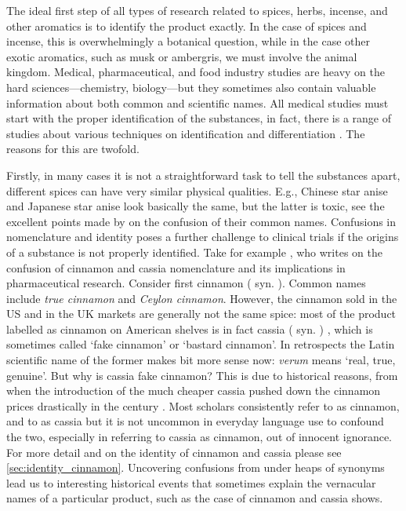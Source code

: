 The ideal first step of all types of research related to spices, herbs, incense, and other aromatics is to identify the product exactly. In the case of spices and incense, this is overwhelmingly a botanical question, while in the case other exotic aromatics, such as musk or ambergris, we must involve the animal kingdom. Medical, pharmaceutical, and food industry studies are heavy on the hard sciences---chemistry, biology---but they sometimes also contain valuable information about both common and scientific names. All medical studies must start with the proper identification of the substances, in fact, there is a range of studies about various techniques on identification and differentiation \autocite[cf.]{ford_cinnamon_2019}. The reasons for this are twofold. 

Firstly, in many cases it is not a straightforward task to tell the substances apart, different spices can have very similar physical qualities. E.g., Chinese star anise  and Japanese star anise  look basically the same, but the latter is toxic, see the excellent points made by \textcite{small_confusion_1996} on the confusion of their common names. Confusions in nomenclature and identity poses a further challenge to clinical trials if the origins of a substance is not properly identified. Take for example \textcite{oketch-rabah_cinnamon_2018}, who writes on the confusion of cinnamon and cassia nomenclature and its implications in pharmaceutical research. Consider first cinnamon ( syn. ). Common names include \textit{true cinnamon} and \textit{Ceylon cinnamon}. However, the cinnamon sold in the US and in the UK markets are generally not the same spice: most of the product labelled as cinnamon on American shelves is in fact cassia ( syn. ) \autocite{oketch-rabah_cinnamon_2018}, which is sometimes called `fake cinnamon' or `bastard cinnamon'. In retrospects the Latin scientific name of the former makes bit more sense now: \textit{verum} means `real, true, genuine'. But why is cassia fake cinnamon? This is due to historical reasons, from when the introduction of the much cheaper cassia pushed down the cinnamon prices drastically in the  century \autocite{wijesekera_chemistry_1978}. Most scholars consistently refer to  as cinnamon, and to  as cassia but it is not uncommon in everyday language use to confound the two, especially in referring to cassia as cinnamon, out of innocent ignorance. For more detail and on the identity of cinnamon and cassia please see \cref{sec:identity_cinnamon}. Uncovering confusions from under heaps of synonyms lead us to interesting historical events that sometimes explain the vernacular names of a particular product, such as the case of cinnamon and cassia shows. 

